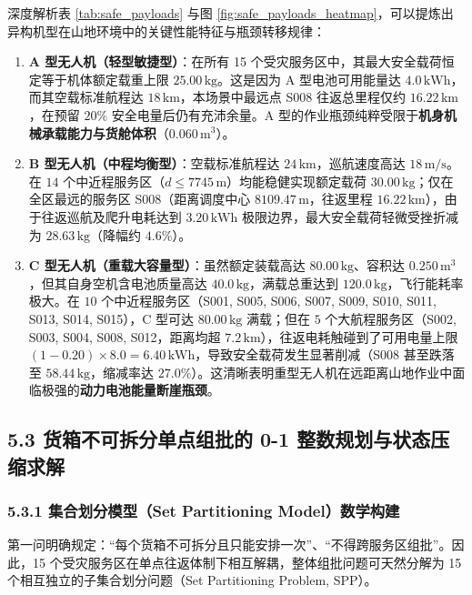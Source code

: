 \documentclass[withoutpreface,bwprint]{format}
\begin{document}
深度解析表 \ref{tab:safe_payloads} 与图 \ref{fig:safe_payloads_heatmap}，可以提炼出异构机型在山地环境中的关键性能特征与瓶颈转移规律：
\begin{enumerate}[leftmargin=*]
    \item \textbf{A 型无人机（轻型敏捷型）}：在所有 15 个受灾服务区中，其最大安全载荷恒定等于机体额定载重上限 $25.00\,\text{kg}$。这是因为 A 型电池可用能量达 $4.0\,\text{kWh}$，而其空载标准航程达 $18\,\text{km}$，本场景中最远点 S008 往返总里程仅约 $16.22\,\text{km}$，在预留 $20\%$ 安全电量后仍有充沛余量。A 型的作业瓶颈纯粹受限于\textbf{机身机械承载能力与货舱体积}（$0.060\,\text{m}^3$）。
    \item \textbf{B 型无人机（中程均衡型）}：空载标准航程达 $24\,\text{km}$，巡航速度高达 $18\,\text{m/s}$。在 $14$ 个中近程服务区（$d \le 7745\,\text{m}$）均能稳健实现额定载荷 $30.00\,\text{kg}$；仅在全区最远的服务区 S008（距离调度中心 $8109.47\,\text{m}$，往返里程 $16.22\,\text{km}$），由于往返巡航及爬升电耗达到 $3.20\,\text{kWh}$ 极限边界，最大安全载荷轻微受挫折减为 $28.63\,\text{kg}$（降幅约 $4.6\%$）。
    \item \textbf{C 型无人机（重载大容量型）}：虽然额定装载高达 $80.00\,\text{kg}$、容积达 $0.250\,\text{m}^3$，但其自身空机含电池质量高达 $40.0\,\text{kg}$，满载总重达到 $120.0\,\text{kg}$，飞行能耗率极大。在 $10$ 个中近程服务区（S001, S005, S006, S007, S009, S010, S011, S013, S014, S015），C 型可达 $80.00\,\text{kg}$ 满载；但在 $5$ 个大航程服务区（S002, S003, S004, S008, S012，距离均超 $7.2\,\text{km}$），往返电耗触碰到了可用电量上限 $(1-0.20)\times 8.0 = 6.40\,\text{kWh}$，导致安全载荷发生显著削减（S008 甚至跌落至 $58.44\,\text{kg}$，缩减率达 $27.0\%$）。这清晰表明重型无人机在远距离山地作业中面临极强的\textbf{动力电池能量断崖瓶颈}。
\end{enumerate}

\subsection{5.3 货箱不可拆分单点组批的 0-1 整数规划与状态压缩求解}

\subsubsection{5.3.1 集合划分模型（Set Partitioning Model）数学构建}
第一问明确规定：“每个货箱不可拆分且只能安排一次”、“不得跨服务区组批”。因此，15 个受灾服务区在单点往返体制下相互解耦，整体组批问题可天然分解为 15 个相互独立的子集合划分问题（Set Partitioning Problem, SPP）\cite{balas1976, wolsey2014}。
\end{document}

